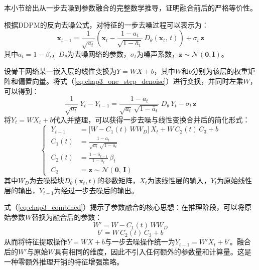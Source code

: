本小节给出从一步去噪到参数融合的完整数学推导，证明融合前后的严格等价性。

根据DDPM\cite{ho2020denoising}的反向去噪公式，对特征的一步去噪过程可以表示为：
\begin{equation}
\mathbf{x}_{t-1} = \frac{1}{\sqrt{a_t}}\!\left(\mathbf{x}_t - \frac{1-a_t}{\sqrt{1-\bar{a}_t}}\,D_\theta(\mathbf{x}_t,\, t)\right) + \sigma_t\,\mathbf{z}
\label{eq:chap3_one_step_denoise}
\end{equation}
其中$a_t = 1 - \beta_t$，$D_\theta$为去噪网络的参数，$\sigma_t$为噪声系数，$\mathbf{z} \sim \mathcal{N}(\mathbf{0}, \mathbf{I})$。

设骨干网络某一嵌入层的线性变换为$Y = WX + b$，其中$W$和$b$分别为该层的权重矩阵和偏置向量。将式（\ref{eq:chap3_one_step_denoise}）进行变换，并同时左乘$W$，可以得到：
\begin{equation}
\frac{1}{\sqrt{a_t}}\,Y_t - Y_{t-1} = \frac{1-a_t}{\sqrt{a_t}\,\sqrt{1-\bar{a}_t}}\,D_\theta\, Y_t - \sigma_t\,\mathbf{z}
\label{eq:chap3_transform}
\end{equation}
将$Y_t = WX_t + b$代入并整理，可以获得一步去噪与线性变换合并后的简化形式：
\begin{equation}
\left\{\;\begin{aligned}
Y_{t-1} &= \bigl[W - C_1(t)\,W W_D\bigr]\,X_t + W\,C_2(t)\,C_3 + b \\[4pt]
C_1(t) &= \frac{1-a_t}{\sqrt{a_t}\,\sqrt{1-\bar{a}_t}} \\[4pt]
C_2(t) &= \frac{1-\bar{a}_{t-1}}{1-\bar{a}_t}\,\beta_t \\[4pt]
C_3 &= \mathbf{z} \sim \mathcal{N}(\mathbf{0},\, \mathbf{I})
\end{aligned}\right.
\label{eq:chap3_combined}
\end{equation}
其中$W_D$为去噪模块$D_\theta(\mathbf{x}_t, t)$的参数矩阵，$X_t$为该线性层的输入，$Y_t$为原始线性层的输出，$Y_{t-1}$为经过一步去噪后的输出。

式（\ref{eq:chap3_combined}）揭示了参数融合的核心思想：在推理阶段，可以将原始参数$W$替换为融合后的参数：
\begin{equation}
W' = W - C_1(t)\,W W_D
\label{eq:chap3_w_prime}
\end{equation}
\vspace{-2pt}
\begin{equation}
b' = W\,C_2(t)\,C_3 + b
\label{eq:chap3_b_prime}
\end{equation}
从而将特征提取操作$Y = WX + b$与一步去噪操作统一为$Y_{t-1} = W'X_t + b'$。融合后的$W'$与原始$W$具有相同的维度，因此不引入任何额外的参数量和计算量。这是一种零额外推理开销的特征增强策略。

